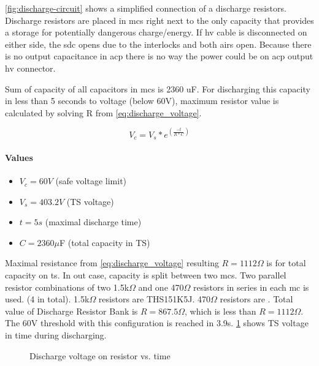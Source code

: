 \ref{fig:discharge-circuit} shows a simplified connection of a discharge resistors. Discharge resistors are placed in \glspl{mc} right next to the only capacity that provides a storage for potentially dangerous charge/energy. If \gls{hv} cable is disconnected on either side, the \gls{sdc} opens due to the interlocks and both \glspl{air} open. Because there is no output capacitance in \gls{acp} there is no way the power could be on \gls{acp} output \gls{hv} connector.

Sum of capacity of all capacitors in \glspl{mc} is 2360 uF. For discharging this capacity in less than 5 seconds to voltage (below 60V), maximum resistor value is calculated by solving R from \ref{eq:discharge_voltage}.

\begin{equation}
	V_{c}=V_{s}*e^{(\frac{-t}{R*C})}
	\label{eq:discharge_voltage}
\end{equation}

\paragraph{Values}
\begin{itemize}
	\item $V_c = 60 V$ (safe voltage limit)
	\item $V_s = 403.2 V$ (TS voltage)
	\item $t = 5 s$ (maximal discharge time)
	\item $C = 2360\mu$F (total capacity in TS)
\end{itemize}

Maximal resistance from \ref{eq:discharge_voltage} resulting $R = 1112\Omega$ is for total capacity on \gls{ts}. In out case, capacity is split between two \glspl{mc}. Two parallel resistor combinations of two 1.5k$\Omega$ and one 470$\Omega$ resistors in series in each \gls{mc} is used. (4 in total). 1.5k$\Omega$ resistors are THS151K5J. 470$\Omega$ resistors are . Total value of Discharge Resistor Bank is $R = 867.5\Omega$, which is less than $R = 1112\Omega$. The 60V threshold with this configuration is reached in 3.9s. \ref{fig:discharge_voltage_time} shows TS voltage in time during discharging.

\begin{figure}
	\caption{Discharge voltage on resistor vs. time}
	\label{fig:discharge_voltage_time}
\end{figure}


